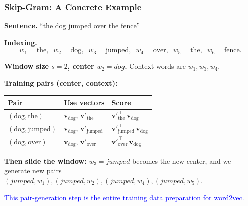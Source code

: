 \documentclass[notes,11pt, aspectratio=169]{beamer}
\newcommand{\vv}{\mathbf{v}}
\begin{document}
\begin{frame}
\frametitle{Skip-Gram: A Concrete Example}

\textbf{Sentence.} \hspace{6pt} ``the dog jumped over the fence''

\vspace{4pt}
\textbf{Indexing.}
\[
    w_1 = \text{the}, \;\; w_2 = \text{dog}, \;\; w_3 = \text{jumped}, \;\; w_4 = \text{over}, \;\; w_5 = \text{the}, \;\; w_6 = \text{fence}.
\]

\vspace{6pt}
\textbf{Window size $s = 2$, center $w_2 = \textit{dog}$.} Context words are $w_1, w_3, w_4$.

\vspace{6pt}
\textbf{Training pairs (center, context):}
\begin{center}
\renewcommand{\arraystretch}{1.2}
\small
\begin{tabular}{lll}
\toprule
\textbf{Pair} & \textbf{Use vectors} & \textbf{Score} \\
\midrule
$(\text{dog}, \text{the})$ & $\vv_\text{dog}$, $\vv'_\text{the}$ & $\vv'^{\,\top}_\text{the}\,\vv_\text{dog}$ \\
$(\text{dog}, \text{jumped})$ & $\vv_\text{dog}$, $\vv'_\text{jumped}$ & $\vv'^{\,\top}_\text{jumped}\,\vv_\text{dog}$ \\
$(\text{dog}, \text{over})$ & $\vv_\text{dog}$, $\vv'_\text{over}$ & $\vv'^{\,\top}_\text{over}\,\vv_\text{dog}$ \\
\bottomrule
\end{tabular}
\end{center}

\vspace{6pt}
\textbf{Then slide the window:} $w_3 = \textit{jumped}$ becomes the new center, and we generate new pairs $(\textit{jumped}, w_1), (\textit{jumped}, w_2), (\textit{jumped}, w_4), (\textit{jumped}, w_5)$.

\vspace{4pt}
\textcolor{blue}{This pair-generation step is the entire training data preparation for word2vec.}
\end{frame}
\end{document}
